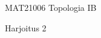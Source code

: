 \documentclass[12pt,a4paper,leqno]{amsart}
\begin{document}
\noindent MAT21006 Topologia IB

\noindent Harjoitus 2 
\begin{comment}
\noindent  Määräaika:  \textbf{torstaina 4.4.2024 klo 23.00 mennessä} (pääsiäisviikko)

\bigskip

\noindent Ratkaisut palautetaan sähköisesti määräaikaan mennessä kurssin Moodle sivun viikottaiseen palautusalueeseen yhtenä pdf-lähetyksenä. 

\smallskip

Pääsiäisen aikataulun takia ohjausvuorot  laskuharjoitustehtävien ratkaisemiseksi  pidetään

\smallskip

\textbf{torstaina 4.4 klo 12-14, ja klo 14-16} Ratkomossa  (kurssin Topologia IB ohjaaja).

\smallskip

Sen sijaan ohjausvuoroa \textbf{ei pidetä tiistaina 26.3}.
Muina aikoina voi  kysyä  neuvoja tehtäviin Ratkomossa tai kurssin Moodle sivun Keskustelualueissa. Kurssin Topologia IA
Telegram-ryhmä jatkaa. 

\bigskip

Aihepiiri:  Luku 10. \textit{Metriikkojen ekvivalenssi. Tuloavaruus}.  Luku 11. \textit{Pistejonot ja raja-arvot}, kohdat [V,11.1-11.5]
Väisälän kirjasta. 
\end{comment}
\bigskip
\end{document}
